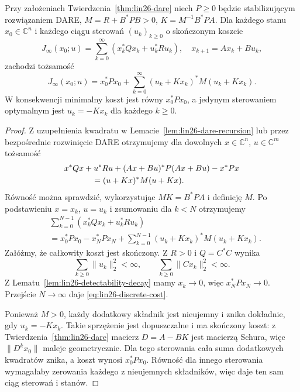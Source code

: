 \begin{twierdzenie}
\label{thm:lin26-dare-optimal}
Przy założeniach
Twierdzenia~\ref{thm:lin26-dare}
niech \(P\ge0\)
będzie stabilizującym
rozwiązaniem DARE,
\(M=R+B^*PB>0\),
\(K=M^{-1}B^*PA\).
Dla każdego stanu
\(x_0\in\mathbb C^n\)
i każdego ciągu sterowań
\((u_k)_{k\ge0}\)
o skończonym koszcie
\[
 J_\infty(x_0;u)
 =\sum_{k=0}^{\infty}
   (x_k^*Qx_k+u_k^*Ru_k),
 \quad x_{k+1}=Ax_k+Bu_k,
\]
zachodzi tożsamość
\[
 J_\infty(x_0;u)
 =x_0^*Px_0+
  \sum_{k=0}^{\infty}
       (u_k+Kx_k)^*
       M(u_k+Kx_k).
 \tag{26.7}\label{eq:lin26-discrete-cost}
\]
W konsekwencji
minimalny koszt jest równy
\(x_0^*Px_0\),
a jedynym sterowaniem
optymalnym jest
\(u_k=-Kx_k\)
dla każdego \(k\ge0\).
\end{twierdzenie}
\begin{proof}
Z uzupełnienia kwadratu
w
Lemacie~\ref{lem:lin26-dare-recursion}
lub przez bezpośrednie
rozwinięcie DARE
otrzymujemy dla dowolnych
\(x\in\mathbb C^n\),
\(u\in\mathbb C^m\)
tożsamość
\[
 \begin{aligned}
 &x^*Qx+u^*Ru
 +(Ax+Bu)^*P(Ax+Bu)-x^*Px\\
 &\hspace{12mm}=(u+Kx)^*M(u+Kx).
 \end{aligned}
\]
Równość można sprawdzić,
wykorzystując
\(MK=B^*PA\)
i definicję \(M\).
Po podstawieniu
\(x=x_k\), \(u=u_k\)
i zsumowaniu dla \(k<N\)
otrzymujemy
\[
 \begin{aligned}
 &\sum_{k=0}^{N-1}
       (x_k^*Qx_k+u_k^*Ru_k)\\
 &=x_0^*Px_0-x_N^*Px_N
   +\sum_{k=0}^{N-1}
       (u_k+Kx_k)^*M(u_k+Kx_k).
 \end{aligned}
\]
Załóżmy, że całkowity
koszt jest skończony.
Z \(R>0\) i \(Q=C^*C\)
wynika
\[
 \sum_{k\ge0}\|u_k\|_2^2<\infty,
 \qquad
 \sum_{k\ge0}\|Cx_k\|_2^2<\infty.
\]
Z
Lematu~\ref{lem:lin26-detectability-decay}
mamy \(x_k\to0\),
więc \(x_N^*Px_N\to0\).
Przejście \(N\to\infty\)
daje
\eqref{eq:lin26-discrete-cost}.

Ponieważ \(M>0\),
każdy dodatkowy składnik
jest nieujemny
i znika dokładnie,
gdy \(u_k=-Kx_k\).
Takie sprzężenie jest
dopuszczalne i ma
skończony koszt:
z
Twierdzenia~\ref{thm:lin26-dare}
macierz \(D=A-BK\)
jest macierzą Schura,
więc \(\|D^kx_0\|\)
maleje geometrycznie.
Dla tego sterowania
cała suma dodatkowych
kwadratów znika,
a koszt wynosi \(x_0^*Px_0\).
Równość dla innego
sterowania wymagałaby
zerowania każdego z
nieujemnych składników,
więc daje ten sam
ciąg sterowań i stanów.
\end{proof}


